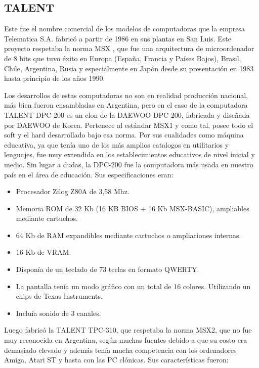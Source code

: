 \documentclass[%
 	final,
%
	notitlepage,
	narroweqnarray,
	inline,
 	twoside,
	]{ieee}
\begin{document}
\subsection*{TALENT}

Este fue el nombre comercial de los modelos de computadoras que la empresa Telematica S.A. fabric\'o a partir de 1986 en sus plantas en San Luis. Este proyecto respetaba la norma MSX \cite{msx}, que fue una arquitectura de microordenador de 8 bits que tuvo \'exito en Europa (Espa\~na, Francia y Pa\'ises Bajos), Brasil, Chile, Argentina, Rusia y especialmente en Jap\'on desde su presentaci\'on en 1983 hasta principio de los a\~nos 1990.

Los desarrollos de estas computadoras no son en realidad producci\'on nacional, m\'as bien fueron ensambladas en Argentina, pero en el caso de la computadora TALENT DPC-200 es un clon de la DAEWOO DPC-200, fabricada y dise\~nada por DAEWOO de Korea. Pertenece al est\'andar MSX1 y como tal, posee todo el soft y el hard desarrollado bajo esa norma.
Por sus cualidades como m\'aquina educativa, ya que ten\'ia uno de los más amplios catalogos en utilitarios y lenguajes, fue muy extendida en los establecimientos educativos de nivel inicial y medio. Sin lugar a dudas, la DPC-200 fue la computadora m\'as usada en nuestro pa\'is en el \'area de educaci\'on. Sus especificaciones eran:

\begin{itemize}
\item Procesador Zilog Z80A de 3,58 Mhz.
\item Memoria ROM de 32 Kb (16 KB BIOS + 16 Kb MSX-BASIC), ampliables mediante cartuchos.
\item 64 Kb de RAM expandibles mediante cartuchos o ampliaciones internas.
\item 16 Kb de VRAM.
\item Dispon\'ia de un teclado de 73 teclas en formato QWERTY.
\item La pantalla ten\'ia un modo gr\'afico con un total de 16 colores. Utilizando un chips de Texas Instruments.
\item Inclu\'ia sonido de 3 canales.
\end{itemize}

Luego fabric\'o la TALENT TPC-310, que respetaba la norma MSX2, que no fue muy reconocida en Argentina, seg\'un muchas fuentes debido a que su costo era demasiado elevado y adem\'as ten\'ia mucha competencia con los ordenadores Amiga, Atari ST y hasta con las PC cl\'onicas.
Sus caracter\'isticas fueron:
\end{document}
